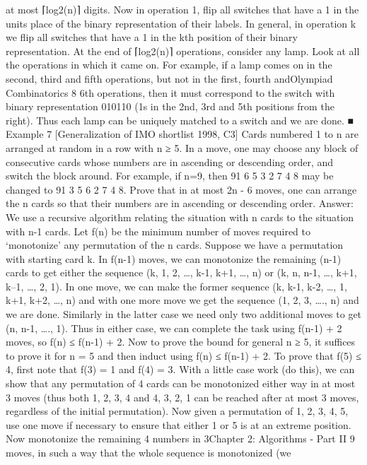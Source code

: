 \documentclass[a4paper,11pt]{book}
\begin{document}
at most ⌈log2(n)⌉ digits. Now in operation 1, flip all switches that
have a 1 in the units place of the binary representation of their
labels. In general, in operation k we flip all switches that have a 1
in the kth position of their binary representation. At the end of
⌈log2(n)⌉ operations, consider any lamp. Look at all the operations
in which it came on. For example, if a lamp comes on in the
second, third and fifth operations, but not in the first, fourth andOlympiad Combinatorics 8
6th operations, then it must correspond to the switch with binary
representation 010110 (1s in the 2nd, 3rd and 5th positions from
the right). Thus each lamp can be uniquely matched to a switch
and we are done. ■
Example 7 [Generalization of IMO shortlist 1998, C3]
Cards numbered 1 to n are arranged at random in a row with n ≥
5. In a move, one may choose any block of consecutive cards
whose numbers are in ascending or descending order, and switch
the block around. For example, if n=9, then 91 6 5 3 2 7 4 8 may be
changed to 91 3 5 6 2 7 4 8. Prove that in at most 2n - 6 moves,
one can arrange the n cards so that their numbers are in
ascending or descending order.
Answer:
We use a recursive algorithm relating the situation with n cards to
the situation with n-1 cards. Let f(n) be the minimum number of
moves required to ‘monotonize’ any permutation of the n cards.
Suppose we have a permutation with starting card k. In f(n-1)
moves, we can monotonize the remaining (n-1) cards to get either
the sequence (k, 1, 2, …, k-1, k+1, …, n) or (k, n, n-1, …, k+1, k–1, …,
2, 1). In one move, we can make the former sequence (k, k-1, k-2,
…, 1, k+1, k+2, …, n) and with one more move we get the sequence
(1, 2, 3, …., n) and we are done. Similarly in the latter case we need
only two additional moves to get (n, n-1, …., 1). Thus in either case,
we can complete the task using f(n-1) + 2 moves, so f(n) ≤ f(n-1) +
2.
Now to prove the bound for general n ≥ 5, it suffices to prove it
for n = 5 and then induct using f(n) ≤ f(n-1) + 2. To prove that f(5)
≤ 4, first note that f(3) = 1 and f(4) = 3. With a little case work (do
this), we can show that any permutation of 4 cards can be
monotonized either way in at most 3 moves (thus both {1, 2, 3, 4}
and {4, 3, 2, 1} can be reached after at most 3 moves, regardless of
the initial permutation). Now given a permutation of {1, 2, 3, 4, 5},
use one move if necessary to ensure that either 1 or 5 is at an
extreme position. Now monotonize the remaining 4 numbers in 3Chapter 2: Algorithms - Part II 9
moves, in such a way that the whole sequence is monotonized (we
\end{document}
